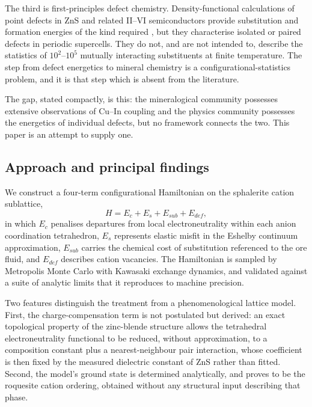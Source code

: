 \documentclass[11pt,a4paper]{article}
\begin{document}
The third is first-principles defect chemistry. Density-functional calculations
of point defects in ZnS and related II--VI semiconductors provide substitution
and formation energies of the kind required
\citep{freysoldt2014,hoang2019}, but they characterise isolated or paired defects in
periodic supercells. They do not, and are not intended to, describe the
statistics of $10^{2}$--$10^{5}$ mutually interacting substituents at finite
temperature. The step from defect energetics to mineral chemistry is a
configurational-statistics problem, and it is that step which is absent from the
literature.

The gap, stated compactly, is this: the mineralogical community possesses
extensive observations of Cu--In coupling and the physics community possesses
the energetics of individual defects, but no framework connects the two. This
paper is an attempt to supply one.

\subsection{Approach and principal findings}

We construct a four-term configurational Hamiltonian on the sphalerite cation
sublattice,
\begin{equation}
H = E_c + E_s + E_{sub} + E_{def},
\label{eq:H}
\end{equation}
in which $E_c$ penalises departures from local electroneutrality within each
anion coordination tetrahedron, $E_s$ represents elastic misfit in the Eshelby
continuum approximation, $E_{sub}$ carries the chemical cost of substitution
referenced to the ore fluid, and $E_{def}$ describes cation vacancies. The
Hamiltonian is sampled by Metropolis Monte Carlo with Kawasaki exchange
dynamics, and validated against a suite of analytic limits that it reproduces to
machine precision.

Two features distinguish the treatment from a phenomenological lattice model.
First, the charge-compensation term is not postulated but derived: an exact
topological property of the zinc-blende structure allows the tetrahedral
electroneutrality functional to be reduced, without approximation, to a
composition constant plus a nearest-neighbour pair interaction, whose
coefficient is then fixed by the measured dielectric constant of ZnS rather than
fitted. Second, the model's ground state is determined analytically, and proves
to be the roquesite cation ordering, obtained without any structural input
describing that phase.
\end{document}

